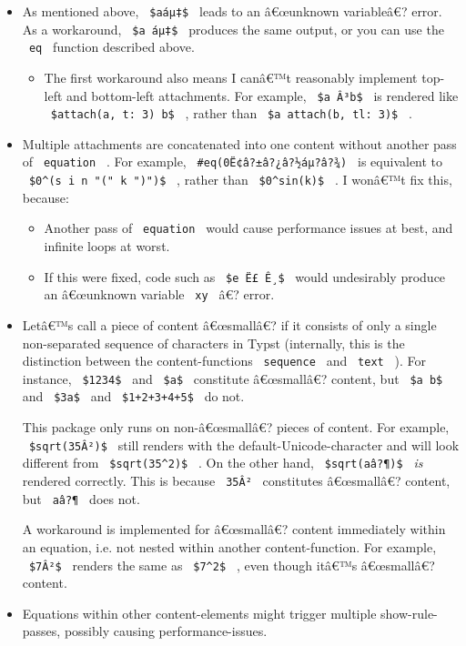 \begin{itemize}
\item
  As mentioned above, \texttt{\ \$aáµ‡\$\ } leads to an â€œunknown
  variableâ€? error. As a workaround, \texttt{\ \$a\ áµ‡\$\ } produces
  the same output, or you can use the \texttt{\ eq\ } function described
  above.

  \begin{itemize}
  \tightlist
  \item
    The first workaround also means I canâ€™t reasonably implement
    top-left and bottom-left attachments. For example,
    \texttt{\ \$a\ Â³b\$\ } is rendered like
    \texttt{\ \$attach(a,\ t:\ 3)\ b\$\ } , rather than
    \texttt{\ \$a\ attach(b,\ tl:\ 3)\$\ } .
  \end{itemize}
\item
  Multiple attachments are concatenated into one content without another
  pass of \texttt{\ equation\ } . For example,
  \texttt{\ \#eq(\textasciigrave{}0Ë¢â?±â?¿â?½áµ?â?¾\textasciigrave{})\ }
  is equivalent to \texttt{\ \$0\^{}(s\ i\ n\ "("\ k\ ")")\$\ } , rather
  than \texttt{\ \$0\^{}sin(k)\$\ } . I wonâ€™t fix this, because:

  \begin{itemize}
  \tightlist
  \item
    Another pass of \texttt{\ equation\ } would cause performance issues
    at best, and infinite loops at worst.
  \item
    If this were fixed, code such as \texttt{\ \$e\ Ë£\ Ê¸\$\ } would
    undesirably produce an â€œunknown variable \texttt{\ xy\ } â€?
    error.
  \end{itemize}
\item
  Letâ€™s call a piece of content â€œsmallâ€? if it consists of only a
  single non-separated sequence of characters in Typst (internally, this
  is the distinction between the content-functions \texttt{\ sequence\ }
  and \texttt{\ text\ } ). For instance, \texttt{\ \$1234\$\ } and
  \texttt{\ \$a\$\ } constitute â€œsmallâ€? content, but
  \texttt{\ \$a\ b\$\ } and \texttt{\ \$3a\$\ } and
  \texttt{\ \$1+2+3+4+5\$\ } do not.

  This package only runs on non-â€œsmallâ€? pieces of content. For
  example, \texttt{\ \$sqrt(35Â²)\$\ } still renders with the
  default-Unicode-character and will look different from
  \texttt{\ \$sqrt(35\^{}2)\$\ } . On the other hand,
  \texttt{\ \$sqrt(aâ?¶)\$\ } \emph{is} rendered correctly. This is
  because \texttt{\ 35Â²\ } constitutes â€œsmallâ€? content, but
  \texttt{\ aâ?¶\ } does not.

  A workaround is implemented for â€œsmallâ€? content immediately within
  an equation, i.e. not nested within another content-function. For
  example, \texttt{\ \$7Â²\$\ } renders the same as
  \texttt{\ \$7\^{}2\$\ } , even though itâ€™s â€œsmallâ€? content.
\item
  Equations within other content-elements might trigger multiple
  show-rule-passes, possibly causing performance-issues.
\end{itemize}

